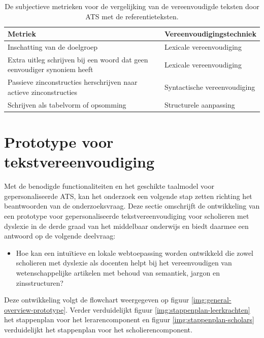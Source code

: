 \begin{center}
	\begin{table}[H]
		\begin{tabular}{ | m{7cm} | m{7cm} | } 
			\hline
			\textbf{Metriek} & \textbf{Vereenvoudigingstechniek} \\
			\hline
			Inschatting van de doelgroep & Lexicale vereenvoudiging \\
			\hline
			Extra uitleg schrijven bij een woord dat geen eenvoudiger synoniem heeft & Lexicale vereenvoudiging \\ \hline
			\hline
			Passieve zinconstructies herschrijven naar actieve zinconstructies & Syntactische vereenvoudiging \\ \hline
			\hline
			Schrijven als tabelvorm of opsomming & Structurele aanpassing \\
			\hline
		\end{tabular}
	\caption{De subjectieve metrieken voor de vergelijking van de vereenvoudigde teksten door ATS met de referentieteksten.}
	\label{table:verg-studie-reftekst-metrieken}
	\end{table}
\end{center}

\section{Prototype voor tekstvereenvoudiging}

Met de benodigde functionaliteiten en het geschikte taalmodel voor gepersonaliseerde ATS, kan het onderzoek een volgende stap zetten richting het beantwoorden van de onderzoeksvraag. Deze sectie omschrijft de ontwikkeling van een prototype voor gepersonaliseerde tekstvereenvoudiging voor scholieren met dyslexie in de derde graad van het middelbaar onderwijs en biedt daarmee een antwoord op de volgende deelvraag: 

\begin{itemize}
	\item Hoe kan een intuïtieve en lokale webtoepassing worden ontwikkeld die zowel scholieren met dyslexie als docenten helpt bij het vereenvoudigen van wetenschappelijke artikelen met behoud van semantiek, jargon en zinsstructuren?
\end{itemize}

Deze ontwikkeling volgt de flowchart weergegeven op figuur \ref{img:general-overview-prototype}. Verder verduidelijkt figuur \ref{img:stappenplan-leerkrachten} het stappenplan voor het lerarencomponent en figuur \ref{img:stappenplan-scholars} verduidelijkt het stappenplan voor het scholierencomponent.

